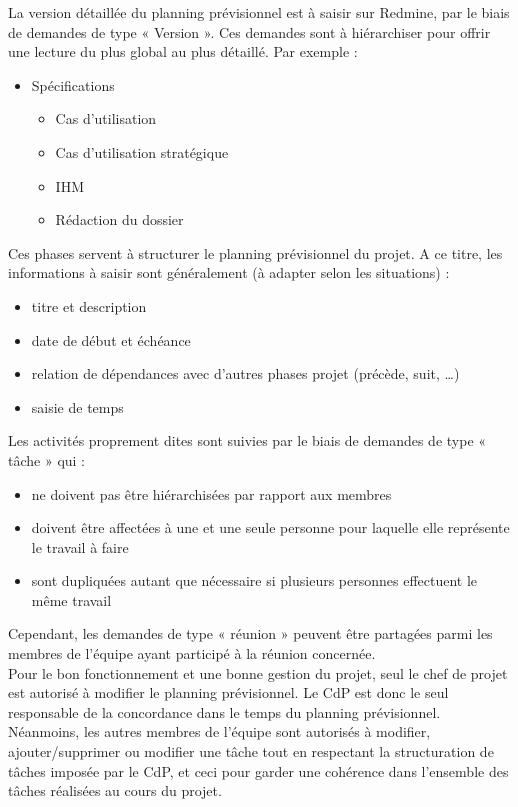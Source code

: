 \documentclass[a4paper,11pt,titlepage]{article}
\begin{document}
La version détaillée du planning prévisionnel est à saisir sur Redmine,
par le biais de demandes de type « Version ». Ces demandes sont à
hiérarchiser pour offrir une lecture du plus global au plus détaillé.
Par exemple :
\begin{itemize}
    \item Spécifications
    \begin{itemize}
        \item Cas d'utilisation
        \item Cas d'utilisation stratégique
        \item IHM
        \item Rédaction du dossier
    \end{itemize}
\end{itemize}
Ces phases servent à structurer le planning prévisionnel du projet.
A ce titre, les informations à saisir sont généralement
(à adapter selon les situations) :
\begin{itemize}
    \item titre et description
    \item date de début et échéance
    \item relation de dépendances avec d'autres phases projet (précède, suit, …)
    \item saisie de temps
\end{itemize}
Les activités proprement dites sont suivies par le biais de demandes
de type « tâche » qui :
\begin{itemize}
    \item ne doivent pas être hiérarchisées par rapport aux membres
    \item doivent être affectées à une et une seule personne pour laquelle elle représente le travail à faire
    \item sont dupliquées autant que nécessaire si plusieurs personnes effectuent le même travail
\end{itemize}

Cependant, les demandes de type « réunion » peuvent être partagées parmi les membres de l'équipe ayant participé à la réunion concernée.\\

Pour le bon fonctionnement et une bonne gestion du projet, seul le chef de projet est
autorisé à modifier le planning prévisionnel. Le CdP est donc le seul responsable de
la concordance dans le temps du planning prévisionnel. Néanmoins, les autres membres
de l'équipe sont autorisés à modifier, ajouter/supprimer ou modifier une tâche tout
en respectant la structuration de tâches imposée par le CdP, et ceci pour garder une
cohérence dans l'ensemble des tâches réalisées au cours du projet.
\end{document}
